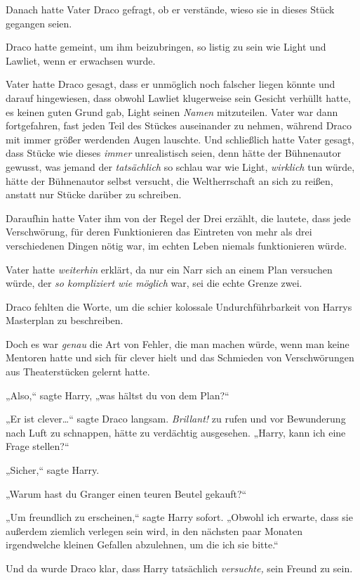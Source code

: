 {Danach hatte Vater Draco gefragt, ob er verstände, wieso sie in dieses Stück gegangen seien.

Draco hatte gemeint, um ihm beizubringen, so listig zu sein wie Light und Lawliet, wenn er erwachsen wurde.

Vater hatte Draco gesagt, dass er unmöglich noch falscher liegen könnte und darauf hingewiesen, dass obwohl Lawliet klugerweise sein Gesicht verhüllt hatte, es keinen guten Grund gab, Light seinen \emph{Namen} mitzuteilen. Vater war dann fortgefahren, fast jeden Teil des Stückes auseinander zu nehmen, während Draco mit immer größer werdenden Augen lauschte. Und schließlich hatte Vater gesagt, dass Stücke wie dieses \emph{immer} unrealistisch seien, denn hätte der Bühnenautor gewusst, was jemand der \emph{tatsächlich} so schlau war wie Light, \emph{wirklich} tun würde, hätte der Bühnenautor selbst versucht, die Weltherrschaft an sich zu reißen, anstatt nur Stücke darüber zu schreiben.

Daraufhin hatte Vater ihm von der Regel der Drei erzählt, die lautete, dass jede Verschwörung, für deren Funktionieren das Eintreten von mehr als drei verschiedenen Dingen nötig war, im echten Leben niemals funktionieren würde.

Vater hatte \emph{weiterhin} erklärt, da nur ein Narr sich an einem Plan versuchen würde, der \emph{so kompliziert wie möglich} war, sei die echte Grenze zwei.

Draco fehlten die Worte, um die schier kolossale Undurchführbarkeit von Harrys Masterplan zu beschreiben.

Doch es war \emph{genau} die Art von Fehler, die man machen würde, wenn man keine Mentoren hatte und sich für clever hielt und das Schmieden von Verschwörungen aus Theaterstücken gelernt hatte.

„Also,“ sagte Harry, „was hältst du von dem Plan?“

„Er ist clever…“ sagte Draco langsam. \emph{Brillant!} zu rufen und vor Bewunderung nach Luft zu schnappen, hätte zu verdächtig ausgesehen. „Harry, kann ich eine Frage stellen?“

„Sicher,“ sagte Harry.

„Warum hast du Granger einen teuren Beutel gekauft?“

„Um freundlich zu erscheinen,“ sagte Harry sofort. „Obwohl ich erwarte, dass sie außerdem ziemlich verlegen sein wird, in den nächsten paar Monaten irgendwelche kleinen Gefallen abzulehnen, um die ich sie bitte.“

Und da wurde Draco klar, dass Harry tatsächlich \emph{versuchte,} sein Freund zu sein.

}
